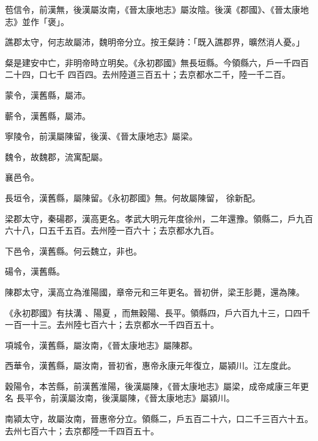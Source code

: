 \begin{pinyinscope}
 苞信令，前漢無，後漢屬汝南，《晉太康地志》屬汝陰。後漢《郡國》、《晉太康地志》並作「褒」。



 譙郡太守，何志故屬沛，魏明帝分立。按王粲詩：「既入譙郡界，曠然消人憂。」



 粲是建安中亡，非明帝時立明矣。《永初郡國》無長垣縣。今領縣六，戶一千四百二十四，口七千
 四百四。去州陸道三百五十；去京都水二千，陸一千二百。



 蒙令，漢舊縣，屬沛。



 蘄令，漢舊縣，屬沛。



 寧陵令，前漢屬陳留，後漢、《晉太康地志》屬梁。



 魏令，故魏郡，流寓配屬。



 襄邑令。



 長垣令，漢舊縣，屬陳留。《永初郡國》無。何故屬陳留，
 徐新配。



 梁郡太守，秦碭郡，漢高更名。孝武大明元年度徐州，二年還豫。領縣二，戶九百六十八，口五千五百。去州陸一百六十；去京都水九百。



 下邑令，漢舊縣。何云魏立，非也。



 碭令，漢舊縣。



 陳郡太守，漢高立為淮陽國，章帝元和三年更名。晉初併，梁王肜薨，還為陳。


《永初郡國》有扶溝
 、陽夏
 ，而無穀陽、長平。領縣四，戶六百九十三，口四千一百一十三。去州陸七百六十；去京都水一千四百五十。



 項城令，漢舊縣，屬汝南，《晉太康地志》屬陳郡。



 西華令，漢舊縣，屬汝南，晉初省，惠帝永康元年復立，屬潁川。江左度此。



 穀陽令，本苦縣，前漢舊淮陽，後漢屬陳，《晉太康地志》屬梁，成帝咸康三年更名
 長平令，前漢屬汝南，後漢屬陳，《晉太康地志》屬潁川。



 南潁太守，故屬汝南，晉惠帝分立。領縣二，戶五百二十六，口二千三百六十五。去州七百六十；去京都陸一千四百五十。




\end{pinyinscope}
